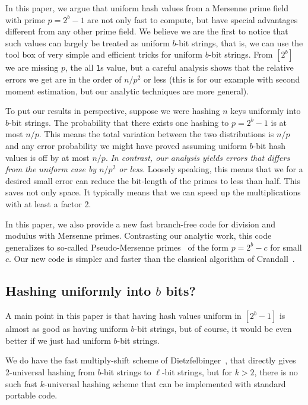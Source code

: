 In this paper, we argue that uniform hash values from a Mersenne prime
field with prime $p=2^b-1$ are not only fast to compute, but have
special advantages different from any other prime field.  We believe
we are the first to notice that such values can largely be treated as
uniform $b$-bit strings, that is, we can use the tool box of very
simple and efficient tricks for uniform $b$-bit strings.  From $[2^b]$
we are missing $p$, the all \texttt1s value, but a careful analysis
shows that the relative errors we get are in the order of $n/p^2$ or
less (this is for our example with second moment estimation, but our
analytic techniques are more general).

To put our results in perspective, suppose we were hashing $n$ keys
uniformly into $b$-bit strings.  The probability that there exists one
hashing to $p=2^b-1$ is at most $n/p$.  This means the total variation between
the two distributions is $n/p$ and any error probability we might have
proved assuming uniform $b$-bit hash values is off by at most $n/p$.
\emph{In contrast, our analysis yields errors that differs from the uniform case by $n/p^2$ or less.}
Loosely speaking, this means that we for a desired small error can reduce
the bit-length of the primes to less than half. This saves not only
space. It typically means that we can speed up the multiplications
with at least a factor 2.

In this paper, we also provide a new fast branch-free code for
division and modulus with Mersenne primes. Contrasting our analytic
work, this code generalizes to so-called Pseudo-Mersenne
primes~\cite{van2014encyclopedia} of the form $p=2^b-c$ for small
$c$. Our new code is simpler and faster than the classical algorithm of
Crandall~\cite{crandall1992method}. 

\subsection{Hashing uniformly into $b$ bits?}\label{sec:b-bit?}
A main point in this paper is that having hash values uniform in $[2^b-1]$
is almost as good as having uniform $b$-bit strings, but of course,
it would be even better if we just had uniform $b$-bit strings.

We do have the fast multiply-shift scheme of Dietzfelbinger~\cite{dietzfel96universal}, that directly gives 2-universal
hashing from $b$-bit strings to $\ell$-bit strings, but for $k>2$,
there is no such fast $k$-universal hashing scheme that
can be implemented with standard portable code.

